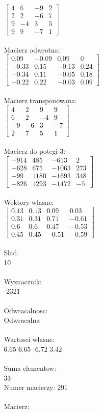 \documentclass[a4paper,12pt]{article}
\begin{document}
$\begin{bmatrix} 4&6&-9&2\\2&2&-6&7\\9&-4&3&5\\9&9&-7&1 \end{bmatrix}$
\\
\\
Macierz odwrotna:\\

$\begin{bmatrix} 0.09&-0.09&0.09&0\\-0.33&0.15&-0.13&0.24\\-0.34&0.11&-0.05&0.18\\-0.22&0.22&-0.03&0.09 \end{bmatrix}$
\\
\\
Macierz transponowana:\\

$\begin{bmatrix} 4&2&9&9\\6&2&-4&9\\-9&-6&3&-7\\2&7&5&1 \end{bmatrix}$
\\
\\
Macierz do potegi 3:\\

$\begin{bmatrix} -914&485&-613&2\\-628&675&-1063&273\\-99&1180&-1693&348\\-826&1293&-1472&-5 \end{bmatrix}$
\\
\\
Wektory wlasne:\\

$\begin{bmatrix} 0.13&0.13&0.09&0.03\\0.31&0.31&0.71&-0.61\\0.6&0.6&0.47&-0.53\\0.45&0.45&-0.51&-0.59 \end{bmatrix}$
\\
\\
Slad:\\
10
\\
\\
Wyznacznik:\\
-2321
\\
\\
Odwracalnosc:\\
Odwracalna
\\
\\
Wartosci wlasne:\\
6.65 6.65 -6.72 3.42
\\
\\
Suma elementow:\\
33
\\
\newpage
Numer macierzy:
291
\\
\\
Macierz:\\
\end{document}
